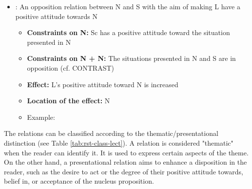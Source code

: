\documentclass{KBook}
\begin{document}
\begin{itemize}
	\item {}: An opposition relation between N and S with the aim of making L have a positive attitude towards N
	\begin{itemize}
		\item \textbf{Constraints on N:} Sc has a positive attitude toward the situation presented in N
		\item \textbf{Constraints on N + N:} The situations presented in N and S are in opposition (cf. CONTRAST)
		\item \textbf{Effect:} L's positive attitude toward N is increased
		\item \textbf{Location of the effect:} N
		\item Example: 
	\end{itemize}
\end{itemize}


The relations  can be classified according to the thematic/presentational distinction (see Table \ref{tab:rst-class-lect}). A relation is considered "thematic" when the reader can identify it. It is used to express certain aspects of the theme. On the other hand, a presentational relation aims to enhance a disposition in the reader, such as the desire to act or the degree of their positive attitude towards, belief in, or acceptance of the nucleus proposition.
\end{document}
